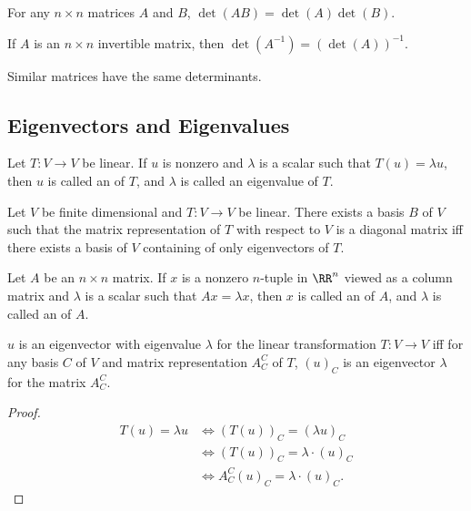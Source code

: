 \begin{theorem}
  For any $n \times n$ matrices $A$ and $B$, $\det(AB) = \det(A)\det(B)$.
\end{theorem}

\begin{corollary}
  If $A$ is an $n \times n$ invertible matrix, then $\det(A^{-1}) = (\det(A))^{-1}$.
\end{corollary}

\begin{corollary}
  Similar matrices have the same determinants.
\end{corollary}

\subsection{Eigenvectors and Eigenvalues}
\begin{definition}
  Let $T : V \to V$ be linear. If $u$ is nonzero and $\lambda$ is a scalar such that $T(u) = \lambda u$, then $u$ is called an  of $T$, and
  $\lambda$ is called an eigenvalue of $T$.
\end{definition}

\begin{theorem}
  Let $V$ be finite dimensional and $T : V \to V$ be linear. There exists a basis $B$ of $V$ such that the matrix representation of $T$ with respect to $V$ is a diagonal
  matrix iff there exists a basis of $V$ containing of only eigenvectors of $T$.
\end{theorem}

\begin{definition}
  Let $A$ be an $n \times n$ matrix. If $x$ is a nonzero $n$-tuple in $\RR^{n}$ viewed as a column matrix and $\lambda$ is a scalar such that $Ax = \lambda x$,
  then $x$ is called an  of $A$, and $\lambda$ is called an  of $A$.
\end{definition}

\begin{theorem}
  $u$ is an eigenvector with eigenvalue $\lambda$ for the linear transformation $T : V \to V$ iff for any basis $C$ of $V$ and matrix representation $A^{C}_{C}$ of $T$,
  $(u)_{C}$ is an eigenvector $\lambda$ for the matrix $A^{C}_{C}$.
\end{theorem}

\begin{proof}
  \begin{align*}
    T(u) = \lambda u &\iff (T(u))_{C} = (\lambda u)_{C} \\ 
                     &\iff (T(u))_{C} = \lambda \cdot (u)_{C} \\ 
                     &\iff A^{C}_{C} (u)_{C} = \lambda \cdot (u)_{C}.
  \end{align*}
\end{proof}

